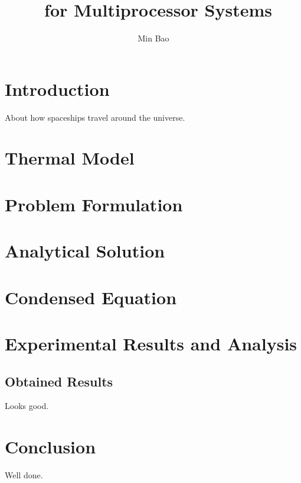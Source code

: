 \documentclass[11pt,a4paper]{article}
\author{Min Bao}
\title{\ssdtc\ for Multiprocessor Systems}
\begin{document}
  \maketitle

  \section{Introduction}
  About how spaceships travel around the universe.

  \section{Thermal Model}
  

  \section{Problem Formulation}
  

  \section{Analytical Solution}
  

  \section{Condensed Equation} \label{condensed-equation}
  

  \section{Experimental Results and Analysis}
  

  \subsection{Obtained Results}
  Looks good.

  \section{Conclusion}
  Well done.

  
\end{document}
